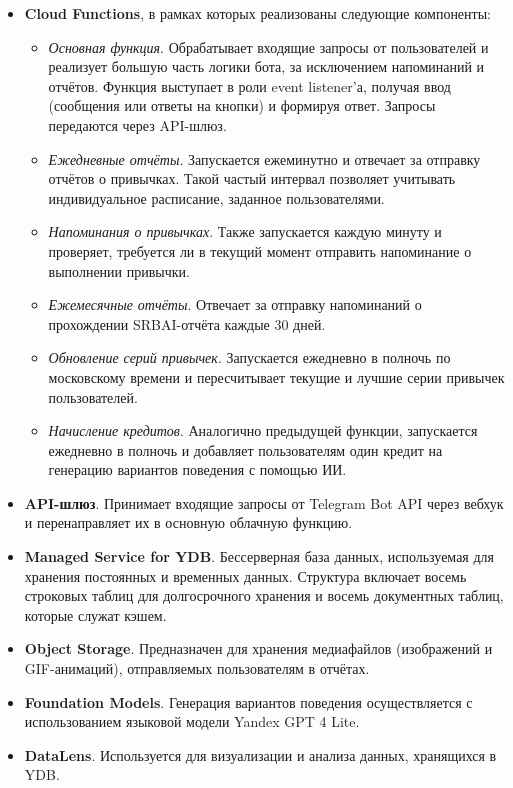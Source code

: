 \documentclass[pdflatex,sn-mathphys-num]{sn-jnl}%
\theoremstyle{thmstyleone}%
\theoremstyle{thmstyletwo}%
\theoremstyle{thmstylethree}%
\begin{document}
\begin{itemize}
    \item \textbf{Cloud Functions}, в рамках которых реализованы следующие компоненты:
    \begin{itemize}
        \item \textit{Основная функция}. Обрабатывает входящие запросы от пользователей и реализует большую часть логики бота, за исключением напоминаний и отчётов. Функция выступает в роли event listener'а, получая ввод (сообщения или ответы на кнопки) и формируя ответ. Запросы передаются через API-шлюз.
        \item \textit{Ежедневные отчёты}. Запускается ежеминутно и отвечает за отправку отчётов о привычках. Такой частый интервал позволяет учитывать индивидуальное расписание, заданное пользователями.
        \item \textit{Напоминания о привычках}. Также запускается каждую минуту и проверяет, требуется ли в текущий момент отправить напоминание о выполнении привычки.
        \item \textit{Ежемесячные отчёты}. Отвечает за отправку напоминаний о прохождении SRBAI-отчёта каждые 30 дней.
        \item \textit{Обновление серий привычек}. Запускается ежедневно в полночь по московскому времени и пересчитывает текущие и лучшие серии привычек пользователей.
        \item \textit{Начисление кредитов}. Аналогично предыдущей функции, запускается ежедневно в полночь и добавляет пользователям один кредит на генерацию вариантов поведения с помощью ИИ.
    \end{itemize}
    
    \item \textbf{API-шлюз}. Принимает входящие запросы от Telegram Bot API через вебхук и перенаправляет их в основную облачную функцию.
    
    \item \textbf{Managed Service for YDB}. Бессерверная база данных, используемая для хранения постоянных и временных данных. Структура включает восемь строковых таблиц для долгосрочного хранения и восемь документных таблиц, которые служат кэшем.
    
    \item \textbf{Object Storage}. Предназначен для хранения медиафайлов (изображений и GIF-анимаций), отправляемых пользователям в отчётах.
    
    \item \textbf{Foundation Models}. Генерация вариантов поведения осуществляется с использованием языковой модели Yandex GPT 4 Lite.
    
    \item \textbf{DataLens}. Используется для визуализации и анализа данных, хранящихся в YDB.
\end{itemize}
\end{document}

